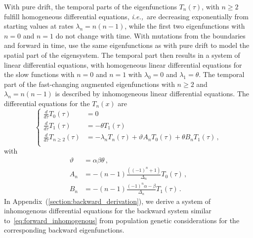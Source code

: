 \documentclass[preprint]{elsarticle}
\newcommand\ie{{\it i.e.,}}
\begin{document}
With pure drift, the temporal parts of the eigenfunctions $T_n(\tau)$, with $n\geq 2$ fulfill homogeneous differential equations, \ie\ are decreasing exponentially from starting values at rates $\lambda_n=n(n-1)$, while the first two eigenfunctions with $n=0$ and $n=1$ do not change with time. With mutations from the boundaries and forward in time, \citet{Vogl16} use the same eigenfunctions as with pure drift to model the spatial part of the eigensystem. The temporal part then results in a system of linear differential equations, with homogeneous linear differential equations for the slow functions with $n=0$ and $n=1$ with $\lambda_0=0$ and $\lambda_1=\theta$. The temporal part of the fast-changing augmented eigenfunctions with $n\geq 2$ and $\lambda_n=n(n-1)$ is described by inhomogeneous linear differential equations. The differential equations for the $T_n(x)$ are
\begin{equation}\label{eq:forward_inhomogenous}
\begin{cases}
  \frac{d}{d\tau} T_0(\tau)&= 0\\
  \frac{d}{d\tau} T_1(\tau)&= -\theta T_1(\tau)\\
  \frac{d}{d\tau} T_{n\geq2}(\tau)&= -\lambda_n T_n(\tau)+\vartheta A_n T_0(\tau)+\theta B_n T_1(\tau)\,,\\
\end{cases}
\end{equation}
with
\begin{equation}
\begin{split}
    \vartheta&=\alpha\beta\theta\,,\\
    A_n&=-(n-1)\frac{((-1)^n+1)}{\Delta_n}T_0(\tau)\,,\\
    B_n&=-(n-1)\frac{(-1)^n\alpha-\beta}{\Delta_n}T_1(\tau)\,.
\end{split}
\end{equation}
In Appendix~(\ref{section:backward_derivation}), we derive a system of inhomogenous differential equations for the backward system similar to~\eqref{eq:forward_inhomogenous} from population genetic considerations for the corresponding backward eigenfunctions. 
\end{document}
